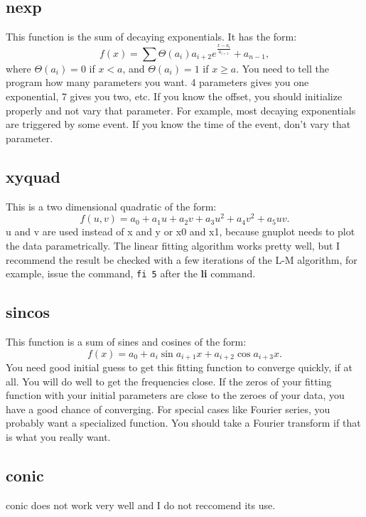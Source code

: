 \subsection{nexp}

        This function is the sum of decaying exponentials. 
 It has  the form:
\[
 f(x) = \sum \Theta (a_i)a_{i+2} e^{\frac{x-a_i}{a_{i+1}}}
 + a_{n-1},
\]
 where $\Theta (a_i) = 0$ if $x < a$, and $\Theta (a_i) = 1$ if
 $x \geq a$.  You need to tell the program how many parameters
 you want.  4 parameters gives you one exponential, 7 gives
 you two, etc.  If you know the offset, you should
 initialize properly and not vary that parameter.  For 
 example, most decaying exponentials are triggered by some
 event. If you know the time of the event, don't vary that
 parameter.

\subsection{xyquad}

 This is a two dimensional quadratic of the form:
\[
 f(u,v) = a_0 + a_1u + a_2v + a_3u^2 + a_4v^2 + a_5uv.
\]
 u and v are used instead of x and y or x0 and x1, because
 gnuplot needs to plot the data parametrically.  The linear
 fitting  algorithm works pretty well, but I recommend the
 result be checked with a few iterations of the L-M
 algorithm, for example, issue the command, {\tt fi 5} after the
 {\bf li} command.

\subsection{sincos}
 This function is a sum of sines and cosines of the form:
\[
f(x) = a_0 + a_i\sin{a_{i+1}x} + a_{i+2}\cos{a_{i+3}x}.
\]
 You need good initial guess to get this fitting function to
 converge quickly, if at all.  You will do well to get the
 frequencies close.  If the zeros of your fitting function
 with your initial parameters are close to the zeroes of
 your data, you have a good chance of converging.  For
 special cases like Fourier series, you probably want a
 specialized function.  You should take a Fourier transform
 if that is what you really want.

\subsection{conic}

        conic does not work very well and I do not reccomend
 its use.


